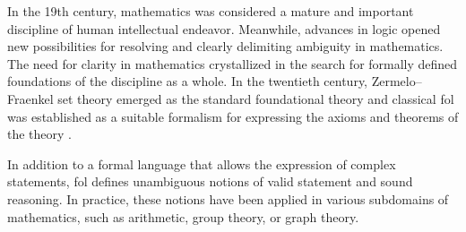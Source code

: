 
In the 19th century, mathematics was considered a mature and important discipline of human intellectual endeavor.
Meanwhile,
advances in logic opened new possibilities
for resolving
and clearly delimiting ambiguity in mathematics.
The need for clarity in mathematics
crystallized in the search for formally defined foundations of the discipline as a whole.
In the twentieth century, Zermelo--Fraenkel set theory emerged as the standard foundational theory
and classical \gls{fol} was established as a suitable formalism for expressing the axioms and theorems of the theory \cite{DBLP:journals/bsl/Ferreiros01}.



In addition to a formal language that allows the expression of complex statements,
\gls{fol} defines unambiguous notions of valid statement and sound reasoning.
In practice, these notions have been applied in various subdomains of mathematics, such as arithmetic, group theory, or graph theory.

